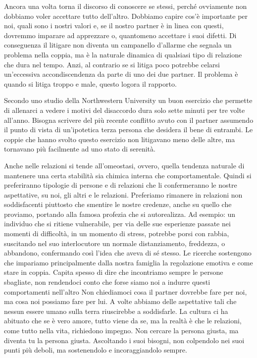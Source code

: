 \documentclass[12pt]{book} %
\begin{document}
Ancora una volta torna il discorso di conoscere se stessi, perché ovviamente non dobbiamo voler accettare tutto
dell'altro. Dobbiamo capire cos'è importante per noi, quali sono i nostri
valori e, se il nostro partner è in linea con questi, dovremmo imparare ad apprezzare o, quantomeno accettare i suoi
difetti. Di conseguenza il litigare non diventa un campanello d'allarme che segnala un problema
nella coppia, ma è la naturale dinamica di qualsiasi tipo di relazione che dura nel tempo. Anzi, al contrario se si
litiga poco potrebbe celarsi un'eccessiva accondiscendenza da parte di uno dei due partner. Il
problema è quando si litiga troppo e male, questo logora il rapporto.

Secondo uno studio della Northwestern University un buon esercizio che permette di allenarci a vedere i motivi del
disaccordo dura solo sette minuti per tre volte all'anno. Bisogna scrivere del più recente
conflitto avuto con il partner assumendo il punto di vista di un'ipotetica terza persona che desidera il bene di
entrambi. Le coppie che hanno svolto questo esercizio non litigavano meno delle altre, ma tornavano più facilmente ad
uno stato di serenità.

Anche nelle relazioni si tende all'omeostasi, ovvero, quella tendenza naturale di mantenere una
certa stabilità sia chimica interna che comportamentale. Quindi si preferiranno tipologie di persone e di relazioni che
li confermeranno le nostre aspettative, su noi, gli altri e le relazioni. Preferiamo rimanere in relazioni non
soddisfacenti piuttosto che smentire le nostre credenze, anche su quello che proviamo, portando alla famosa profezia
che si autorealizza. Ad esempio: un individuo che si ritiene vulnerabile, per via delle sue esperienze passate nei
momenti di difficoltà, in un momento di stress, potrebbe porsi con rabbia, suscitando nel suo interlocutore un normale
distanziamento, freddezza, o abbandono, confermando così l'idea che aveva di sé stesso. Le
ricerche sostengono che impariamo principalmente dalla nostra famiglia la regolazione emotiva e come stare in coppia.
Capita spesso di dire che incontriamo sempre le persone sbagliate, non rendendoci conto che forse siamo noi a indurre
questi comportamenti
nell'altro Non
chiediamoci cosa il partner dovrebbe fare per noi, ma cosa noi possiamo fare per lui. A volte abbiamo delle aspettative
tali che nessun essere umano sulla terra riuscirebbe a soddisfarle. La cultura ci ha abituato che se è vero amore,
tutto viene da se, ma la realtà è che le relazioni, come tutto nella vita, richiedono impegno. Non cercare la persona
giusta, ma diventa tu la persona giusta. Ascoltando i suoi bisogni, non colpendolo nei suoi punti più deboli, ma
sostenendolo e incoraggiandolo sempre.
\end{document}
